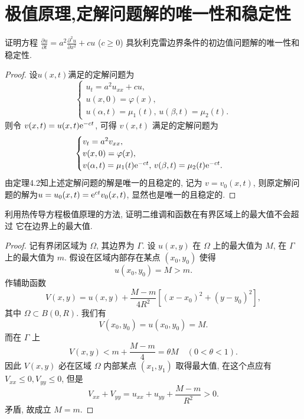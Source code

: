 \section{极值原理,定解问题解的唯一性和稳定性}

\begin{exercise}
  证明方程 $\frac{\partial u}{\partial t} = a^2 \frac{\partial^2 u}{\partial x^2} + cu$
  ($c\geq 0$) 具狄利克雷边界条件的初边值问题解的唯一性和稳定性.
\end{exercise}

\begin{proof}
  设$u(x,t)$满足的定解问题为
  \[\begin{cases}
    u_t = a^2 u_{xx} + cu, \\
    u(x,0) = \varphi(x), \\
    u(\alpha,t) = \mu_1(t),\,u(\beta,t)=\mu_2(t).
  \end{cases}\]
  则令 $v(x,t)=u(x,t) \mathrm{e}^{-ct}$, 可得 $v(x,t)$ 满足的定解问题为
  \[\begin{cases}
    v_t = a^2v_{xx}, \\
    v(x,0) = \varphi(x), \\
    v(\alpha,t) = \mu_1(t)\mathrm{e}^{-ct},\,v(\beta,t) = \mu_2(t)\mathrm{e}^{-ct}.
  \end{cases}\]
  由定理4.2知上述定解问题的解是唯一的且稳定的,
  记为 $v=v_0(x,t)$, 则原定解问题的解为$u = u_0(x,t) = \mathrm{e}^{ct}v_0(x,t)$, 显然也是唯一的且稳定的.
\end{proof}


\begin{exercise}
  利用热传导方程极值原理的方法, 证明二维调和函数在有界区域上的最大值不会超过
  它在边界上的最大值.
\end{exercise}

\begin{proof}
  记有界闭区域为 $\Omega$, 其边界为 $\Gamma$.
  设 $u(x,y)$ 在 $\Omega$ 上的最大值为 $M$, 在 $\Gamma$ 上的最大值为 $m$.
  假设在区域内部存在某点 $(x_0,y_0)$ 使得
  \[u(x_0,y_0) = M > m.\]
  作辅助函数
  \[V(x,y) = u(x,y)+\frac{M-m}{4R^2}\left[(x-x_0)^2+(y-y_0)^2\right],\]
  其中 $\Omega\subset B(0,R)$. 我们有
  \[V(x_0,y_0)=u(x_0,y_0)=M.\]
  而在 $\Gamma$ 上
  \[V(x,y) < m+\frac{M-m}{4}=\theta M\quad (0<\theta<1).\]
  因此 $V(x,y)$ 必在区域 $\Omega$ 内部某点 $(x_1,y_1)$ 取得最大值,
  在这个点应有 $V_{xx}\leq0,V_{yy}\leq 0$, 但是
  \[V_{xx}+V_{yy}=u_{xx}+u_{yy}+\frac{M-m}{R^2}>0.\]
  矛盾, 故成立 $M=m$.
\end{proof}


